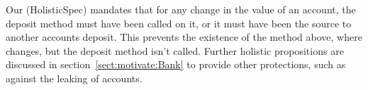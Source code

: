 Our (HolisticSpec) mandates that for any change in the value of an account, the deposit method must have been called on it, or it must have been the source to another accounts deposit. This prevents the existence of the  method above, where  changes, but the deposit method isn't called. Further holistic propositions are discussed in section~\ref{sect:motivate:Bank} to provide other protections, such as against the leaking of accounts.
% 
%
\vspace{.02in}
%
% 

